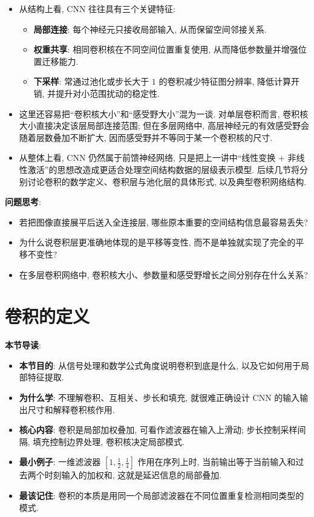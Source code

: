 \documentclass{../nndlcourse}
\begin{document}
\begin{enumerate}
\begin{itemize}
        \item 从结构上看, CNN 往往具有三个关键特征:
        \begin{itemize}
            \item \textbf{局部连接}: 每个神经元只接收局部输入, 从而保留空间邻接关系.
            \item \textbf{权重共享}: 相同卷积核在不同空间位置重复使用, 从而降低参数量并增强位置迁移能力.
            \item \textbf{下采样}: 常通过池化或步长大于 $1$ 的卷积减少特征图分辨率, 降低计算开销, 并提升对小范围扰动的稳定性.
        \end{itemize}
        \item 这里还容易把“卷积核大小”和“感受野大小”混为一谈. 对单层卷积而言, 卷积核大小直接决定该层局部连接范围; 但在多层网络中, 高层神经元的有效感受野会随着层数叠加不断扩大, 因而感受野并不等同于某一个卷积核的尺寸.
        \item 从整体上看, CNN 仍然属于前馈神经网络, 只是把上一讲中“线性变换 + 非线性激活”的思想改造成更适合处理空间结构数据的层级表示模型. 后续几节将分别讨论卷积的数学定义、卷积层与池化层的具体形式, 以及典型卷积网络结构.
    \end{itemize}
\end{enumerate}

\textbf{问题思考}:
\begin{itemize}
    \item 若把图像直接展平后送入全连接层, 哪些原本重要的空间结构信息最容易丢失?
    \item 为什么说卷积层更准确地体现的是平移等变性, 而不是单独就实现了完全的平移不变性?
    \item 在多层卷积网络中, 卷积核大小、参数量和感受野增长之间分别存在什么关系?
\end{itemize}

\section{卷积的定义}

\textbf{本节导读}:
\begin{itemize}
    \item \textbf{本节目的}: 从信号处理和数学公式角度说明卷积到底是什么, 以及它如何用于局部特征提取.
    \item \textbf{为什么学}: 不理解卷积、互相关、步长和填充, 就很难正确设计 CNN 的输入输出尺寸和解释卷积核作用.
    \item \textbf{核心内容}: 卷积是局部加权叠加, 可看作滤波器在输入上滑动; 步长控制采样间隔, 填充控制边界处理, 卷积核决定局部模式.
    \item \textbf{最小例子}: 一维滤波器 $[1,\frac{1}{2},\frac{1}{4}]$ 作用在序列上时, 当前输出等于当前输入和过去两个时刻输入的加权和, 这就是延迟信息的局部叠加.
    \item \textbf{最该记住}: 卷积的本质是用同一个局部滤波器在不同位置重复检测相同类型的模式.
\end{itemize}
\end{document}
